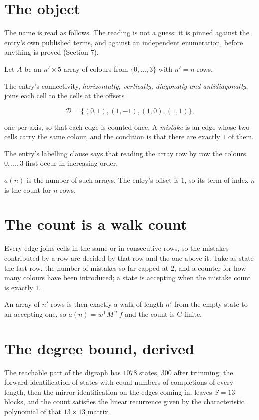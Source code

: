 \documentclass[11pt]{article}
\theoremstyle{definition}
\begin{document}
\section{The object}

The name is read as follows. The reading is not a guess: it is pinned against the entry's own published terms, and against an independent enumeration, before anything is proved (Section 7).

Let $A$ be an $n' \times 5$ array of colours from $\{0,\dots,3\}$ with $n' = n$ rows.

The entry's connectivity, {\itshape horizontally, vertically, diagonally and antidiagonally}, joins each cell to the cells at the offsets

\[\mathcal{D} = \{(0,1), (1,-1), (1,0), (1,1)\},\]

one per axis, so that each edge is counted once. A {\itshape mistake} is an edge whose two cells carry the same colour, and the condition is that there are exactly $1$ of them.

The entry's labelling clause says that reading the array row by row the colours $0,\dots,3$ first occur in increasing order.

$a(n)$ is the number of such arrays. The entry's offset is 1, so its term of index $n$ is the count for $n$ rows.

\section{The count is a walk count}

Every edge joins cells in the same or in consecutive rows, so the mistakes contributed by a row are decided by that row and the one above it. Take as state the last row, the number of mistakes so far capped at $2$, and a counter for how many colours have been introduced; a state is accepting when the mistake count is exactly $1$.

An array of $n'$ rows is then exactly a walk of length $n'$ from the empty state to an accepting one, so $a(n) = w^{\mathsf T}M^{\,n'}f$ and the count is C-finite.

\section{The degree bound, derived}

The reachable part of the digraph has $1078$ states, $300$ after trimming; the forward identification of states with equal numbers of completions of every length, then the mirror identification on the edges coming in, leaves $S = 13$ blocks, and the count satisfies the linear recurrence given by the characteristic polynomial of that $13\times13$ matrix.
\end{document}
